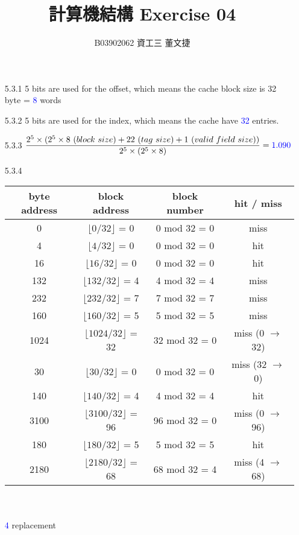 \documentclass[12pt, a4paper]{article}
\date{}
\title{\vspace{-3.0cm} 計算機結構 \hspace{0cm} Exercise 04 \\ \vspace{0cm}}
\author{\normalsize B03902062 \hspace{0cm} 資工三 \hspace{0cm} 董文捷}
\begin{document}
\maketitle
\begin{itemize}[font=\bfseries]

\item[5.3.1] 5 bits are used for the offset, which means the cache block size is 32 byte = \textcolor{blue}{8} words

\item[5.3.2] 5 bits are used for the index, which means the cache have \textcolor{blue}{32} entries.

\item[5.3.3] $\displaystyle \frac{2^5 \times (2^5 \times 8 \makebox{ } (block\makebox{ }size) + 22 \makebox{ } (tag\makebox{ }size) + 1 \makebox{ } (valid\makebox{ }field\makebox{ }size))}{2^5 \times (2^5 \times 8)} = \textcolor{blue}{1.090}$

\item[5.3.4]
\begin{tabular}[t]{|c|c|c|c|} 
\hline
byte address & block address & block number & hit / miss \\
\hline
0 & $\lfloor 0 / 32 \rfloor$ = 0 & 0 mod 32 = 0 & miss \\
\hline
4 & $\lfloor 4 / 32 \rfloor$ = 0 & 0 mod 32 = 0 & hit \\
\hline
16 & $\lfloor 16 / 32 \rfloor$ = 0 & 0 mod 32 = 0 & hit \\
\hline
132 & $\lfloor 132 / 32 \rfloor$ = 4 & 4 mod 32 = 4 & miss \\
\hline
232 & $\lfloor 232 / 32 \rfloor$ = 7 & 7 mod 32 = 7 & miss \\
\hline
160 & $\lfloor 160 / 32 \rfloor$ = 5 & 5 mod 32 = 5 & miss \\
\hline
1024 & $\lfloor 1024 / 32 \rfloor$ = 32 & 32 mod 32 = 0 & miss (0 $\rightarrow$ 32) \\
\hline
30 & $\lfloor 30 / 32 \rfloor$ = 0 & 0 mod 32 = 0 & miss (32 $\rightarrow$ 0) \\
\hline
140 & $\lfloor 140 / 32 \rfloor$ = 4 & 4 mod 32 = 4 & hit \\
\hline
3100 & $\lfloor 3100 / 32 \rfloor$ = 96 & 96 mod 32 = 0 & miss (0 $\rightarrow$ 96)\\
\hline
180 & $\lfloor 180 / 32 \rfloor$ = 5 & 5 mod 32 = 5 & hit \\
\hline
2180 & $\lfloor 2180 / 32 \rfloor$ = 68 & 68 mod 32 = 4 & miss (4 $\rightarrow$ 68)\\
\hline
\end{tabular} \\
\vspace*{0.2cm} \\
\textcolor{blue}{4} replacement


\end{itemize}
\end{document}
